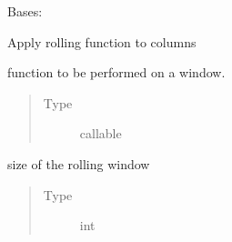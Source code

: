 \documentclass[letterpaper,10pt,english]{sphinxmanual}
\begin{document}

\begin{fulllineitems}
\label{\detokenize{dalio.pipe:dalio.pipe.col_generation.Rolling}}
Bases: {\hyperref[\detokenize{dalio.pipe:dalio.pipe.pipe.Pipe}]{}}

Apply rolling function to columns

\begin{fulllineitems}
\label{\detokenize{dalio.pipe:dalio.pipe.col_generation.Rolling._rolling_func}}
function to be performed on a window.
\begin{quote}\begin{description}
\item[{Type}] \leavevmode
callable

\end{description}\end{quote}

\end{fulllineitems}


\begin{fulllineitems}
\label{\detokenize{dalio.pipe:dalio.pipe.col_generation.Rolling._window}}
size of the rolling window
\begin{quote}\begin{description}
\item[{Type}] \leavevmode
int

\end{description}\end{quote}

\end{fulllineitems}


\end{fulllineitems}
\end{document}
